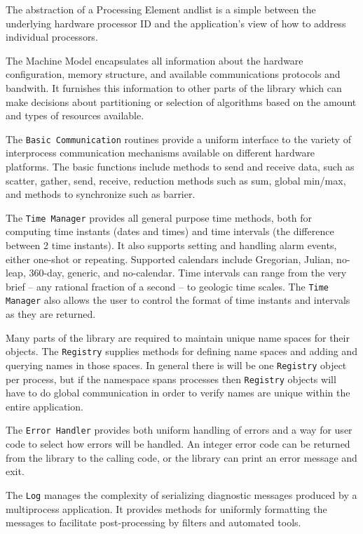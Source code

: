 The abstraction of a Processing Element andlist is a simple  between
the underlying hardware processor ID and the application's view
of how to address individual processors.  

The Machine Model encapsulates all information about the
hardware configuration, memory structure, and available
communications protocols and bandwith.  It furnishes this
information to other parts of the library which can
make decisions about partitioning or selection of algorithms
based on the amount and types of resources available.

The {\tt Basic Communication} routines provide a uniform interface to
the variety of interprocess communication mechanisms available
on different hardware platforms.  
The basic functions include methods to send
and receive data, such as scatter, gather, send, receive,
reduction methods such as sum, global min/max, and methods
to synchronize such as barrier. 

The {\tt Time Manager} provides all general purpose time methods, both
for computing time instants (dates and times) and time intervals
(the difference between 2 time instants).   It also supports 
setting and handling alarm events, either one-shot or repeating.
Supported calendars include Gregorian, Julian, no-leap, 360-day, 
generic, and no-calendar.
Time intervals can range from the very brief -- any rational fraction
of a second -- to geologic time scales.
The {\tt Time Manager} also allows the user to control the format of
time instants and intervals as they are returned.

Many parts of the library are required to maintain unique name
spaces for their objects.  The {\tt Registry} supplies methods
for defining name spaces and adding and querying names in those
spaces.  In general there is will be one {\tt Registry} object per
process, but if the namespace spans processes then {\tt Registry} 
objects will have to do global communication in order to verify names
are unique within the entire application.

The {\tt Error Handler} provides both uniform handling of errors and
a way for user code to select how errors will be handled.
An integer error code can be returned from the library to the
calling code, or the library can print an error message and exit.

The {\tt Log} manages the complexity of serializing diagnostic
messages produced by a multiprocess application.  It provides
methods for uniformly formatting the messages to facilitate
post-processing by filters and automated tools.

